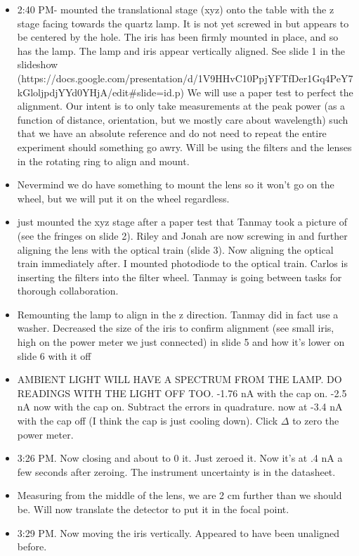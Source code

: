 \documentclass[11pt]{article}
\begin{document}
\begin{itemize}
\item 2:40 PM- mounted the translational stage (xyz) onto the table with the z stage facing towards the quartz lamp. It is not yet screwed in but appears to be centered by the hole. The iris has been firmly mounted in place, and so has the lamp. The lamp and iris appear vertically aligned. See slide 1 in the slideshow (https://docs.google.com/presentation/d/1V9HHvC10PpjYFTfDer1Gq4PeY7kGloljpdjYYd0YHjA/edit#slide=id.p) We will use a paper test to perfect the alignment. Our intent is to only take measurements at the peak power (as a function of distance, orientation, but we mostly care about wavelength) such that we have an absolute reference and do not need to repeat the entire experiment should something go awry. Will be using the filters and the lenses in the rotating ring to align and mount. 
\item Nevermind we do have something to mount the lens so it won't go on the wheel, but we will put it on the wheel regardless. 
\item just mounted the xyz stage after a paper test that Tanmay took a picture of (see the fringes on slide 2). Riley and Jonah are now screwing in and further aligning the lens with the optical train (slide 3). Now aligning the optical train immediately after. I mounted photodiode to the optical train.
Carlos is inserting the filters into the filter wheel. Tanmay is going between tasks for thorough collaboration. 
\item Remounting the lamp to align in the z direction. Tanmay did in fact use a washer. Decreased the size of the iris to confirm alignment (see small iris, high on the power meter we just connected) in slide 5 and how it's lower on slide 6 with it off
\item AMBIENT LIGHT WILL HAVE A SPECTRUM FROM THE LAMP. DO READINGS WITH THE LIGHT OFF TOO. -1.76 nA with the cap on. -2.5 nA now with the cap on. Subtract the errors in quadrature. now at -3.4 nA with the cap off (I think the cap is just cooling down). Click $\Delta$ to zero the power meter. 
\item 3:26 PM. Now closing and about to 0 it. Just zeroed it. Now it's at .4 nA a few seconds after zeroing. The instrument uncertainty is in the datasheet. 
\item Measuring from the middle of the lens, we are 2 cm further than we should be. Will now translate the detector to put it in the focal point. 
\item 3:29 PM. Now moving the iris vertically. Appeared to have been unaligned before. 

\end{itemize}
\end{document}
